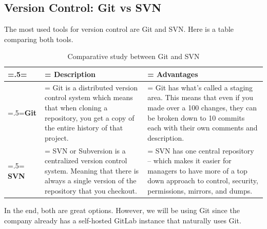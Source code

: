 \subsection{Version Control: Git vs SVN}
The most used tools for version control are Git and SVN. Here is a table comparing both tools.
\begin{table}[H]
    \renewcommand{\arraystretch}{1.5}%
    \caption{Comparative study between Git and SVN}
    \centering
    \medskip
    \begin{tabularx}{1\textwidth} {
            | >{\hsize=.5\hsize\linewidth=\hsize\centering\arraybackslash}X
            | >{\hsize=1.25\hsize\linewidth=\hsize\justifying\arraybackslash}X
            | >{\hsize=1.25\hsize\linewidth=\hsize\justifying\arraybackslash}X |}
        \hline
        \rowcolor{primary} & \textbf {Description}                                                                                                                                   & \textbf {Advantages}                                                                                                                                                                     \\
        \hline
        \textbf{Git}       & \noindent Git is a distributed version control system which means that when cloning a repository, you get a copy of the entire history of that project. & \noindent Git has what's called a staging area. This means that even if you made over a 100 changes, they can be broken down to 10 commits each with their own comments and description. \\
        \hline
        \textbf{SVN}       & \noindent SVN or Subversion is a centralized version control system. Meaning that there is always a single version of the repository that you checkout. & \noindent SVN has one central repository – which makes it easier for managers to have more of a top down approach to control, security, permissions, mirrors, and dumps.                 \\
        \hline
    \end{tabularx}
\end{table}
In the end, both are great options. However, we will be using Git since the company already has a self-hosted GitLab instance that naturally uses Git.

